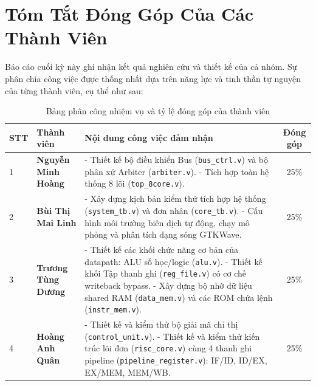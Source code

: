 \chapter*{Tóm Tắt Đóng Góp Của Các Thành Viên}

Báo cáo cuối kỳ này ghi nhận kết quả nghiên cứu và thiết kế của cả nhóm. Sự phân chia công việc được thống nhất dựa trên năng lực và tinh thần tự nguyện của từng thành viên, cụ thể như sau:

\vspace{0.5cm}

\begin{table}[h!]
\centering
\small
\begin{tabularx}{\textwidth}{p{0.5cm} X p{6.0cm} c}
\toprule
\textbf{STT} & \textbf{Thành viên} & \textbf{Nội dung công việc đảm nhận} & \textbf{Đóng góp} \\
\midrule
1 & \textbf{Nguyễn Minh Hoàng} & 
- Thiết kế bộ điều khiển Bus (\texttt{bus\_ctrl.v}) và bộ phân xử Arbiter (\texttt{arbiter.v}).\newline
- Tích hợp toàn hệ thống 8 lõi (\texttt{top\_8core.v}). & 25\% \\
\midrule
2 & \textbf{Bùi Thị Mai Linh} & 
- Xây dựng kịch bản kiểm thử tích hợp hệ thống (\texttt{system\_tb.v}) và đơn nhân (\texttt{core\_tb.v}).\newline
- Cấu hình môi trường biên dịch tự động, chạy mô phỏng và phân tích dạng sóng GTKWave. & 25\% \\
\midrule
3 & \textbf{Trương Tùng Dương} & 
- Thiết kế các khối chức năng cơ bản của datapath: ALU số học/logic (\texttt{alu.v}).\newline
- Thiết kế khối Tập thanh ghi (\texttt{reg\_file.v}) có cơ chế writeback bypass.\newline
- Xây dựng bộ nhớ dữ liệu shared RAM (\texttt{data\_mem.v}) và các ROM chứa lệnh (\texttt{instr\_mem.v}). & 25\% \\

\midrule
4 & \textbf{Hoàng Anh Quân} & 
- Thiết kế và kiểm thử bộ giải mã chỉ thị (\texttt{control\_unit.v}).\newline
- Thiết kế và kiểm thử kiến trúc lõi đơn (\texttt{risc\_core.v}) cùng 4 thanh ghi pipeline (\texttt{pipeline\_register.v}): IF/ID, ID/EX, EX/MEM, MEM/WB. & 25\% \\
\bottomrule
\end{tabularx}
\caption{Bảng phân công nhiệm vụ và tỷ lệ đóng góp của thành viên}
\label{tab:contributions}
\end{table}
